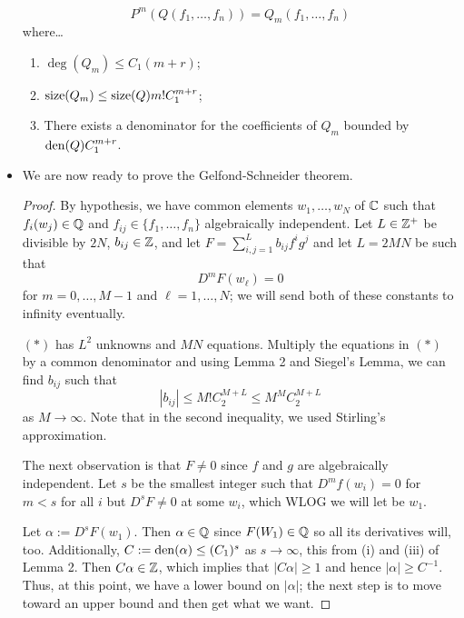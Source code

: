 \documentclass[../notes.tex]{subfiles}
\begin{document}
\begin{itemize}
    \begin{equation*}
        P^m(Q(f_1,\dots,f_n)) = Q_m(f_1,\dots,f_n)
    \end{equation*}
    where\dots
    \begin{enumerate}[label={\roman*.)}]
        \item $\deg(Q_m)\leq C_1(m+r)$;
        \item $\operatorname{size}(Q_m)\leq\operatorname{size}(Q)m!C_1^{m+r}$;
        \item There exists a denominator for the coefficients of $Q_m$ bounded by $\operatorname{den}(Q)C_1^{m+r}$.
    \end{enumerate}
    \item We are now ready to prove the Gelfond-Schneider theorem.
    \begin{proof}
        By hypothesis, we have common elements $w_1,\dots,w_N$ of $\mathbb{C}$ such that $f_i(w_j)\in\mathbb{Q}$ and $f_{ij}\in\{f_1,\dots,f_n\}$ algebraically independent. Let $L\in\mathbb{Z}^+$ be divisible by $2N$, $b_{ij}\in\mathbb{Z}$, and let $F=\sum_{i,j=1}^Lb_{ij}f^ig^j$ and let $L=2MN$ be such that
        \begin{equation*}
            D^mF(w_\ell) = 0\tag{$*$}
        \end{equation*}
        for $m=0,\dots,M-1$ and $\ell=1,\dots,N$; we will send both of these constants to infinity eventually.\par
        $(*)$ has $L^2$ unknowns and $MN$ equations. Multiply the equations in $(*)$ by a common denominator and using Lemma 2 and Siegel's Lemma, we can find $b_{ij}$ such that
        \begin{equation*}
            |b_{ij}| \leq M!C_2^{M+L} \leq M^MC_2^{M+L}\tag{$**$}
        \end{equation*}
        as $M\to\infty$. Note that in the second inequality, we used Stirling's approximation.\par
        The next observation is that $F\neq 0$ since $f$ and $g$ are algebraically independent. Let $s$ be the smallest integer such that $D^mf(w_i)=0$ for $m<s$ for all $i$ but $D^sF\neq 0$ at some $w_i$, which WLOG we will let be $w_1$.\par
        Let $\alpha:=D^sF(w_1)$. Then $\alpha\in\mathbb{Q}$ since $F(W_1)\in\mathbb{Q}$ so all its derivatives will, too. Additionally, $C:=\operatorname{den}(\alpha)\leq(C_1)^s$ as $s\to\infty$, this from (i) and (iii) of Lemma 2. Then $C\alpha\in\mathbb{Z}$, which implies that $|C\alpha|\geq 1$ and hence $|\alpha|\geq C^{-1}$. Thus, at this point, we have a lower bound on $|\alpha|$; the next step is to move toward an upper bound and then get what we want.\par

\end{proof}
\end{itemize}
\end{document}
